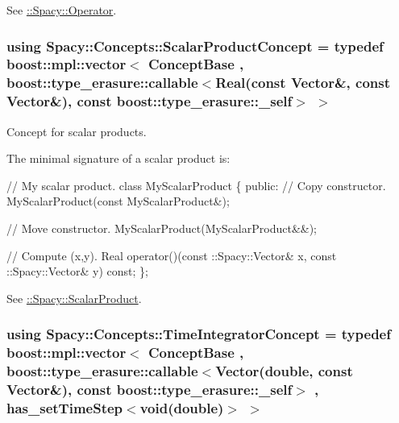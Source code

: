 See \hyperlink{group__SpacyGroup_ga3f89622eba80cf840b2a7102f1303455_OperatorAnchor}{\+:\+:Spacy\+:\+:Operator}. \hypertarget{group__ConceptGroup_ga1308724cda3078f228fb05c29556805d_ga1308724cda3078f228fb05c29556805d}{}
\subsubsection[{Scalar\+Product\+Concept}]{\setlength{\rightskip}{0pt plus 5cm}using {\bf Spacy\+::\+Concepts\+::\+Scalar\+Product\+Concept} = typedef boost\+::mpl\+::vector$<$ Concept\+Base , boost\+::type\+\_\+erasure\+::callable$<$Real(const Vector\&, const Vector\&), const boost\+::type\+\_\+erasure\+::\+\_\+self$>$ $>$}\label{group__ConceptGroup_ga1308724cda3078f228fb05c29556805d_ga1308724cda3078f228fb05c29556805d}


Concept for scalar products. 

\label{group__ConceptGroup_ga1308724cda3078f228fb05c29556805d_ScalarProductConceptAnchor}%
\hypertarget{group__ConceptGroup_ga1308724cda3078f228fb05c29556805d_ScalarProductConceptAnchor}{}%
The minimal signature of a scalar product is\+: 
\begin{DoxyCode}
\textcolor{comment}{// My scalar product.}
\textcolor{keyword}{class }MyScalarProduct
\{
\textcolor{keyword}{public}:
  \textcolor{comment}{// Copy constructor.}
  MyScalarProduct(\textcolor{keyword}{const} MyScalarProduct&);

  \textcolor{comment}{// Move constructor.}
  MyScalarProduct(MyScalarProduct&&);

  \textcolor{comment}{// Compute (x,y).}
  Real operator()(const ::Spacy::Vector& x, const ::Spacy::Vector& y) \textcolor{keyword}{const};
\};
\end{DoxyCode}


See \hyperlink{group__SpacyGroup_ga9fe0b4de20da1ab1ca3d04a0f96343e1_ScalarProductAnchor}{\+:\+:Spacy\+:\+:Scalar\+Product}. \hypertarget{group__ConceptGroup_ga45ecfe57ffb996aa97c9ff89a647f095_ga45ecfe57ffb996aa97c9ff89a647f095}{}
\subsubsection[{Time\+Integrator\+Concept}]{\setlength{\rightskip}{0pt plus 5cm}using {\bf Spacy\+::\+Concepts\+::\+Time\+Integrator\+Concept} = typedef boost\+::mpl\+::vector$<$ Concept\+Base , boost\+::type\+\_\+erasure\+::callable$<$Vector(double, const Vector\&), const boost\+::type\+\_\+erasure\+::\+\_\+self$>$ , has\+\_\+set\+Time\+Step$<$void(double)$>$ $>$}\label{group__ConceptGroup_ga45ecfe57ffb996aa97c9ff89a647f095_ga45ecfe57ffb996aa97c9ff89a647f095}


